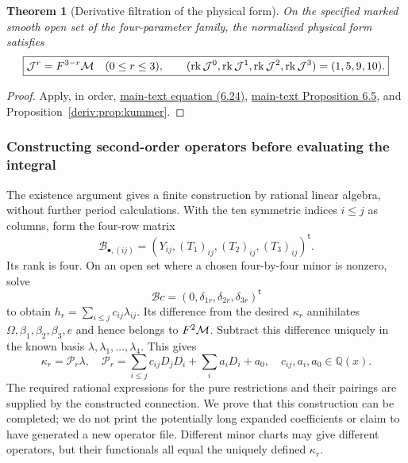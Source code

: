 \documentclass[11pt,a4paper,oneside]{article}
\theoremstyle{plain}
\newtheorem{theorem}{Theorem}[section]
\theoremstyle{definition}
\theoremstyle{remark}
\newcommand{\Q}{\mathbb Q}
\numberwithin{equation}{section}
\newcommand{\otherref}[2]{\href{#1.pdf}{#2}}
\begin{document}
\begin{theorem}[Derivative filtration of the physical form]\label{deriv:thm:jets}
On the specified marked smooth open set of the four-parameter family, the normalized physical form satisfies
\begin{equation}\label{deriv:eq:jets}
 \boxed{\mathcal J^r=F^{3-r}\mathcal M\quad(0\le r\le3),
 \qquad (\operatorname{rk}\mathcal J^0,\operatorname{rk}\mathcal J^1,\operatorname{rk}\mathcal J^2,\operatorname{rk}\mathcal J^3)
 =(1,5,9,10).}
\end{equation}
\end{theorem}
\begin{proof}
Apply, in order, \otherref{feynman_periods_long_paper_en}{main-text equation (6.24)}, \otherref{feynman_periods_long_paper_en}{main-text Proposition 6.5}, and Proposition~\ref{deriv:prop:kummer}.
\end{proof}

\subsubsection{Constructing second-order operators before evaluating the integral}
The existence argument gives a finite construction by rational linear algebra, without further period calculations. With the ten symmetric indices $i\le j$ as columns, form the four-row matrix
\begin{equation}\label{deriv:eq:Bmatrix}
 \mathcal B_{\bullet,(ij)}=
 (Y_{ij},(T_1)_{ij},(T_2)_{ij},(T_3)_{ij})^{\mathsf t}.
\end{equation}
Its rank is four. On an open set where a chosen four-by-four minor is nonzero, solve
\[
 \mathcal Bc=(0,\delta_{1r},\delta_{2r},\delta_{3r})^{\mathsf t}
\]
to obtain $h_r=\sum_{i\le j}c_{ij}\lambda_{ij}$. Its difference from the desired $\kappa_r$ annihilates $\Omega,\beta_1,\beta_2,\beta_3,e$ and hence belongs to $F^2\mathcal M$. Subtract this difference uniquely in the known basis $\lambda,\lambda_1,\ldots,\lambda_4$. This gives
\begin{equation}\label{deriv:eq:operator}
 \kappa_r=\mathscr P_r\lambda,
 \quad\mathscr P_r=
 \sum_{i\le j}c_{ij}D_jD_i+\sum_i a_iD_i+a_0,
 \quad c_{ij},a_i,a_0\in\Q(x).
\end{equation}
The required rational expressions for the pure restrictions and their pairings are supplied by the constructed connection. We prove that this construction can be completed; we do not print the potentially long expanded coefficients or claim to have generated a new operator file. Different minor charts may give different operators, but their functionals all equal the uniquely defined $\kappa_r$.
\end{document}
